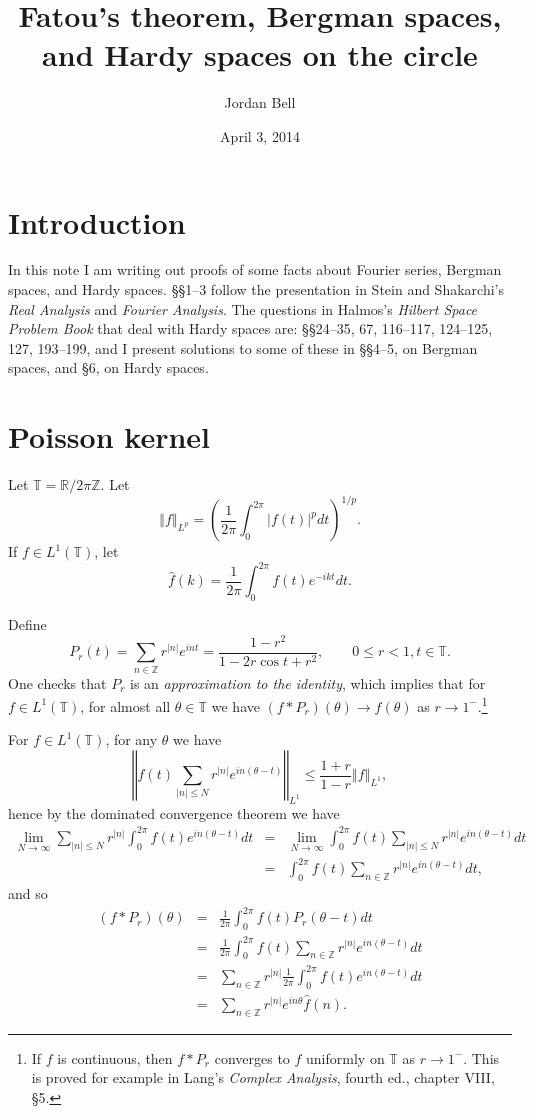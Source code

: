 \documentclass{article}
\newcommand{\norm}[1]{\left\Vert #1 \right\Vert}
\begin{document}
\title{Fatou's theorem, Bergman  spaces, and Hardy spaces on the  circle}
\author{Jordan Bell}
\date{April 3, 2014}
\maketitle

\section{Introduction}
In this note I am writing out proofs of some facts about Fourier series, Bergman spaces, and Hardy spaces. \S \S 1--3 follow the presentation in
Stein and Shakarchi's {\em Real Analysis}
and {\em Fourier Analysis}. The questions in Halmos's {\em Hilbert Space Problem Book} that deal with Hardy spaces are: \S \S 24--35,  67, 116--117,
124--125, 127, 193--199, and I present solutions to some of these in \S \S 4--5, on Bergman spaces, and \S 6, on Hardy spaces.


\section{Poisson kernel}
\label{poissonsection}
Let $\mathbb{T}=\mathbb{R} / 2\pi \mathbb{Z}$.  
Let 
\[
\norm{f}_{L^p} = \left( \frac{1}{2\pi} \int_0^{2\pi} |f(t)|^p dt \right)^{1/p}.
\]
If $f \in L^1(\mathbb{T})$, let
\[
\hat{f}(k)=\frac{1}{2\pi}\int_0^{2\pi} f(t) e^{-ikt}dt.
\] 



Define
\[
P_r(t)=\sum_{n \in \mathbb{Z}} r^{|n|} e^{int}=\frac{1-r^2}{1-2r\cos t + r^2}, \qquad 0 \leq r < 1, t \in \mathbb{T}.
\]
One checks that $P_r$ is an {\em approximation to the identity}, which implies that for $f \in L^1(\mathbb{T})$, for almost
all $\theta \in \mathbb{T}$ we have $(f * P_r)(\theta) \to f(\theta)$ as $r \to 1^-$.\footnote{If $f$ is continuous, then $f*P_r$ converges to $f$ uniformly on
$\mathbb{T}$ as $r \to 1^-$. This is proved for example in Lang's {\em Complex Analysis}, fourth ed., chapter VIII, \S 5.}

For $f \in L^1(\mathbb{T})$, for any $\theta$ we have
\[
\norm{f(t) \sum_{|n| \leq N} r^{|n|} e^{in(\theta-t)}}_{L^1} \leq \frac{1+r}{1-r} \norm{f}_{L^1},
\]
hence by the dominated convergence theorem we have
\begin{eqnarray*}
\lim_{N \to \infty} \sum_{|n| \leq N}  r^{|n|} \int_0^{2\pi} f(t)  e^{in(\theta-t)} dt 
&=&
\lim_{N \to \infty}  \int_0^{2\pi} f(t) \sum_{|n| \leq N} r^{|n|} e^{in(\theta-t)} dt\\
&=&\int_0^{2\pi} f(t) \sum_{n \in \mathbb{Z}} r^{|n|} e^{in(\theta-t)} dt,
\end{eqnarray*}
and so
\begin{eqnarray*}
(f*P_r)(\theta)&=&\frac{1}{2\pi}\int_0^{2\pi} f(t) P_r(\theta-t) dt\\
&=&\frac{1}{2\pi}\int_0^{2\pi} f(t)  \sum_{n \in \mathbb{Z}}  r^{|n|} e^{in(\theta-t)} dt\\
&=&\sum_{n \in \mathbb{Z}}  r^{|n|} \frac{1}{2\pi}\int_0^{2\pi} f(t)  e^{in(\theta-t)} dt\\
&=&\sum_{n \in \mathbb{Z}}  r^{|n|} e^{in\theta} \hat{f}(n).
\end{eqnarray*}
\end{document}
